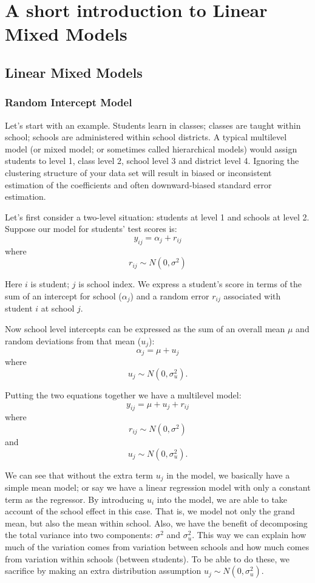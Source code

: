 \chapter{A short introduction to Linear Mixed Models}

\section{Linear Mixed Models}
\subsection{Random Intercept Model}

Let's start with an example.  Students learn in classes; classes are
taught within school; schools are administered within school districts.
A typical multilevel model (or mixed model; or sometimes called
hierarchical models) would assign students to level 1, class level 2,
school level 3 and district level 4.  Ignoring the clustering
structure of your data set will result in biased or inconsistent
estimation of the coefficients and often downward-biased standard
error estimation. 
 
Let's first consider a two-level situation: students at level 1 and schools at level 2.  Suppose our model for students' test scores is:
\[ y_{ij}=\alpha_j +  r_{ij} \]
where \[ r_{ij} \sim  N(0, \sigma^2)\]

Here $i$ is student; $j$ is school index.  We express a student's score in terms of the sum of an intercept for school ($\alpha_j$) and a random error $r_{ij}$ associated with student $i$ at school $j$.

Now school level intercepts can be expressed as the sum of an overall mean $\mu$ and random deviations from that mean ($u_j$):
\[\alpha_j= \mu + u_j\]
where  \[ u_{j} \sim  N(0, \sigma_{u}^2).\]

Putting the two equations together we have a multilevel model:
\[ y_{ij}=\mu + u_j  +  r_{ij} \]
where \[ r_{ij} \sim  N(0, \sigma^2)\] 
and   \[ u_{j} \sim  N(0, \sigma_{u}^2).\]

We can see that without the extra term $u_j$ in the model, we basically have a simple mean model; or say we have a linear regression model with only a constant term as the regressor.  By introducing $u_i$ into the model, we are able to take account of the school effect in this case.  That is, we model not only the grand mean, but also the mean within school.  Also, we have the benefit of decomposing the total variance into two components: $\sigma^2$ and $\sigma_u^2$.  This way we can explain how much of the variation comes from variation between schools and how much comes from variation within schools (between students).  To be able to do these, we sacrifice by making an extra distribution assumption $ u_{j} \sim  N(0, \sigma_{u}^2)$.

